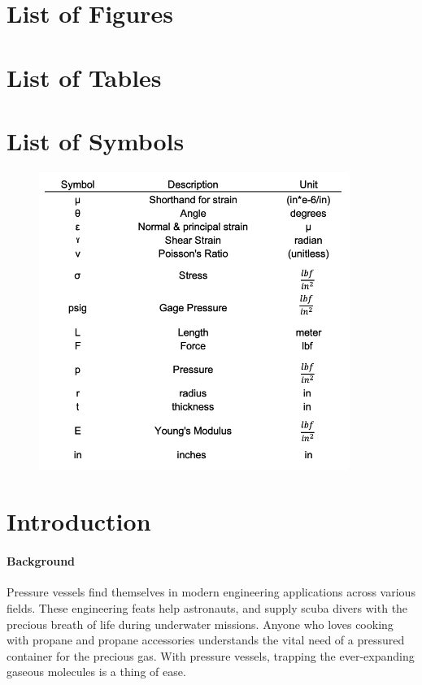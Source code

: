 \documentclass[12pt]{article}
\begin{document}
\newpage
\tableofcontents
\newpage

\newpage
\listoffigures
\section{List of Figures}

\newpage
\listoftables
\section{List of Tables}


\newpage
\section*{List of Symbols}
\begin{figure}[H]
	\centering
	\includegraphics[width=0.9\textwidth]{symbols}
\end{figure}
\newpage




\section{Introduction}
\paragraph{Background} 
Pressure vessels find themselves in modern engineering applications across various fields. These 
engineering feats help astronauts, and supply scuba divers with the precious breath of life during
underwater missions. Anyone who loves cooking with propane and propane accessories understands the 
vital need of a pressured container for the precious gas. With pressure vessels, trapping the ever-expanding
gaseous molecules is a thing of ease. 
\end{document}
